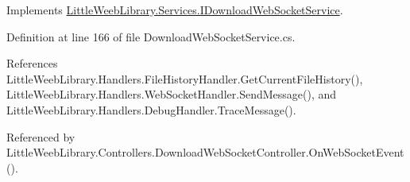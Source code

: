 Implements \mbox{\hyperlink{interface_little_weeb_library_1_1_services_1_1_i_download_web_socket_service_a2a3129b4bddba363d748c5608633c083}{Little\+Weeb\+Library.\+Services.\+I\+Download\+Web\+Socket\+Service}}.



Definition at line 166 of file Download\+Web\+Socket\+Service.\+cs.



References Little\+Weeb\+Library.\+Handlers.\+File\+History\+Handler.\+Get\+Current\+File\+History(), Little\+Weeb\+Library.\+Handlers.\+Web\+Socket\+Handler.\+Send\+Message(), and Little\+Weeb\+Library.\+Handlers.\+Debug\+Handler.\+Trace\+Message().



Referenced by Little\+Weeb\+Library.\+Controllers.\+Download\+Web\+Socket\+Controller.\+On\+Web\+Socket\+Event().


